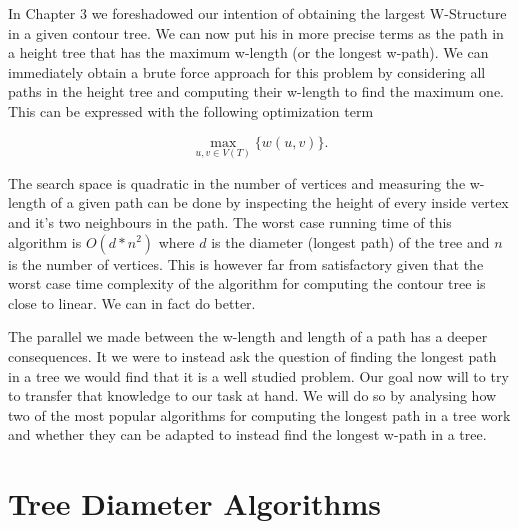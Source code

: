 In Chapter 3 we foreshadowed our intention of obtaining the largest W-Structure in a given contour tree. We can now put his in more precise terms as the path in a height tree that has the maximum w-length (or the longest w-path). We can immediately obtain a brute force approach for this problem by considering all paths in the height tree and computing their w-length to find the maximum one. This can be expressed with the following optimization term

$$ \max_{u, v \in V(T)}\{ w(u, v) \} .$$

The search space is quadratic in the number of vertices and measuring the w-length of a given path can be done by inspecting the height of every inside vertex and it's two neighbours in the path. The worst case running time of this algorithm is $O(d*n^2)$ where $d$ is the diameter (longest path) of the tree and $n$ is the number of vertices. This is however far from satisfactory given that the worst case time complexity of the algorithm for computing the contour tree is close to linear. We can in fact do better.

The parallel we made between the w-length and length of a path has a deeper consequences. It we were to instead ask the question of finding the longest path in a tree we would find that it is a well studied problem. Our goal now will to try to transfer that knowledge to our task at hand. We will do so by analysing how two of the most popular algorithms for computing the longest path in a tree work and whether they can be adapted to instead find the longest w-path in a tree.


\section{Tree Diameter Algorithms}

